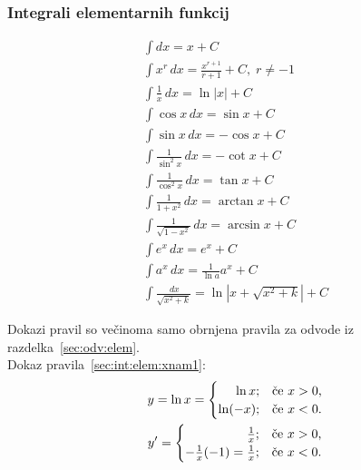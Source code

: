 \documentclass[a4paper,oneside,12pt,fleqn]{article}
\def\kos{\cos}
\renewcommand{\d}{\ensuremath{\,d}} %
\newcommand{\dx}{\ensuremath{\d x}}
\numberwithin{equation}{section}
\begin{document}
\subsubsection{Integrali elementarnih funkcij}
\label{sec:int:elem}
\begin{gather}
  \int\!\!dx = x + C \label{sec:int:elem:1} \\
  \int\!x^r\dx = \frac{x^{r+1}}{r+1} + C, \; r \neq -1 \label{sec:int:elem:xnan} \\
  \int\!\frac{1}{x}\dx = \ln|x| + C \label{sec:int:elem:xnam1} \\
  \int\!\kos x\dx = \sin x + C \label{sec:int:elem:cos} \\
  \int\!\sin x\dx = -\kos x + C \label{sec:int:elem:sin} \\
  \int\!\frac{1}{\sin^2x}\dx = -\cot x + C \label{sec:int:elem:1zsin2} \\
  \int\!\frac{1}{\kos^2x}\dx = \tan x + C \label{sec:int:elem:1zcos2} \\
  \int\!\frac{1}{1+x^2}\dx = \arctan x + C \label{sec:int:elem:1z1x2} \\
  \int\!\frac{1}{\sqrt{1-x^2}}\dx = \arcsin x + C \label{sec:int:elem:1zkor1mx2} \\
  \int\!e^x\dx = e^x + C \label{sec:int:elem:ex} \\
  \int\!a^x\dx = \frac{1}{\ln a}a^x + C \label{sec:int:elem:ax} \\
  \int\!\frac{\dx}{\sqrt{x^2+k}} = \ln|x+\sqrt{x^2+k}| + C \label{sec:int:elem:dolga}
\end{gather}

Dokazi pravil so večinoma samo obrnjena pravila za odvode iz
razdelka~\ref{sec:odv:elem}. \\
Dokaz pravila~\eqref{sec:int:elem:xnam1}:
\begin{gather*}
  y = \ln x = 
  \begin{cases}
    \hfill    \ln x; & \text{če $x > 0$,} \\
    \hfill \ln (-x); & \text{če $x < 0$.}
  \end{cases} \\
  y' = 
  \begin{cases}
    \hfill \frac{1}{x}; & \text{če $x > 0$,} \\
    \hfill -\frac{1}{x}(-1) = \frac{1}{x}; & \text{če $x < 0$.}
  \end{cases}
\end{gather*}
\end{document}
